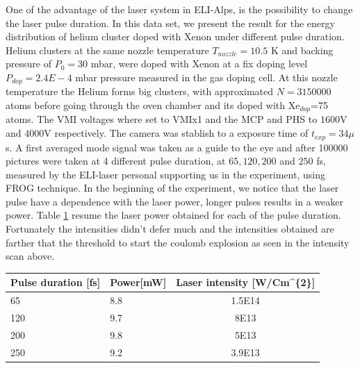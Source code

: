  One of the advantage of the laser system in ELI-Alps, is the possibility to change the laser pulse duration. In this data set, we present the result for the energy distribution of helium cluster doped with Xenon under different pulse duration.  Helium clusters at the same nozzle temperature $T_{nozzle}=10.5$ K and  backing pressure of $P_{0}=30$ mbar, were doped with Xenon at a fix doping level $P_{dop}=2.4E-4$ mbar pressure measured in the gas doping cell. At this nozzle temperature the Helium forms big clusters, with approximated $N=3150000$ atoms before going through the oven chamber and its doped with Xe$_{dop}$=75 atoms. The VMI voltages where set to VMIx1 and the MCP and PHS to $1600$V and $4000$V respectively. The camera was stablish to a exposure time of $t_{exp}=34 \mu$s. A first averaged mode signal was taken as a guide to the eye and after 100000 pictures were taken at 4 different pulse duration, at $65, 120, 200$ and $250$  fs, measured by the ELI-laser personal supporting us in the experiment, using FROG technique.
In the beginning of the experiment, we notice that the laser pulse have a dependence with the laser power,   longer pulses results in a weaker power. Table \ref{tab:pulsepower} resume the laser power obtained for each of the pulse duration. Fortunately the intensities didn't defer much and the intensities obtained are farther that the threshold to start the coulomb explosion as seen in the intensity scan above.
  
   
\begin{table}[]
\centering
\label{tab:pulsepower}
\begin{tabular}{|l|l|c|}
\hline
Pulse duration {[}fs{]} & \multicolumn{1}{c|}{Power{[}mW{]}} & Laser intensity {[}W/Cm\textasciicircum{}\{2\}{]} \\ \hline
65 & 8.8 & 1.5E14 \\ \hline
120 & 9.7 & 8E13 \\ \hline
200 & 9.8 & 5E13 \\ \hline
250 & 9.2 & 3.9E13 \\ \hline
\end{tabular}
\end{table}


